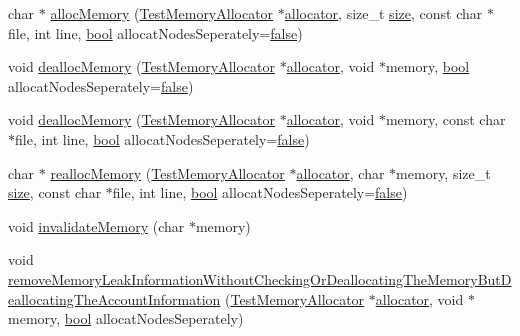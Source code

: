 \begin{DoxyCompactItemize}
\item 
char $\ast$ \hyperlink{class_memory_leak_detector_ace7838f234f5dea076a6ab2528a66164}{alloc\+Memory} (\hyperlink{class_test_memory_allocator}{Test\+Memory\+Allocator} $\ast$\hyperlink{_memory_leak_warning_test_8cpp_a83fc2e9b9142613f7df2bcc3ff8292bc}{allocator}, size\+\_\+t \hyperlink{gst__avb__playbin_8c_a439227feff9d7f55384e8780cfc2eb82}{size}, const char $\ast$file, int line, \hyperlink{avb__gptp_8h_af6a258d8f3ee5206d682d799316314b1}{bool} allocat\+Nodes\+Seperately=\hyperlink{avb__gptp_8h_af6a258d8f3ee5206d682d799316314b1ae9de385ef6fe9bf3360d1038396b884c}{false})
\item 
void \hyperlink{class_memory_leak_detector_a1526d6f241a7f41eaeae20fd2c712873}{dealloc\+Memory} (\hyperlink{class_test_memory_allocator}{Test\+Memory\+Allocator} $\ast$\hyperlink{_memory_leak_warning_test_8cpp_a83fc2e9b9142613f7df2bcc3ff8292bc}{allocator}, void $\ast$memory, \hyperlink{avb__gptp_8h_af6a258d8f3ee5206d682d799316314b1}{bool} allocat\+Nodes\+Seperately=\hyperlink{avb__gptp_8h_af6a258d8f3ee5206d682d799316314b1ae9de385ef6fe9bf3360d1038396b884c}{false})
\item 
void \hyperlink{class_memory_leak_detector_a235bec7842c694f869f6edbf131a6c55}{dealloc\+Memory} (\hyperlink{class_test_memory_allocator}{Test\+Memory\+Allocator} $\ast$\hyperlink{_memory_leak_warning_test_8cpp_a83fc2e9b9142613f7df2bcc3ff8292bc}{allocator}, void $\ast$memory, const char $\ast$file, int line, \hyperlink{avb__gptp_8h_af6a258d8f3ee5206d682d799316314b1}{bool} allocat\+Nodes\+Seperately=\hyperlink{avb__gptp_8h_af6a258d8f3ee5206d682d799316314b1ae9de385ef6fe9bf3360d1038396b884c}{false})
\item 
char $\ast$ \hyperlink{class_memory_leak_detector_a6aded764a2297f52a104b75eae2d4b5c}{realloc\+Memory} (\hyperlink{class_test_memory_allocator}{Test\+Memory\+Allocator} $\ast$\hyperlink{_memory_leak_warning_test_8cpp_a83fc2e9b9142613f7df2bcc3ff8292bc}{allocator}, char $\ast$memory, size\+\_\+t \hyperlink{gst__avb__playbin_8c_a439227feff9d7f55384e8780cfc2eb82}{size}, const char $\ast$file, int line, \hyperlink{avb__gptp_8h_af6a258d8f3ee5206d682d799316314b1}{bool} allocat\+Nodes\+Seperately=\hyperlink{avb__gptp_8h_af6a258d8f3ee5206d682d799316314b1ae9de385ef6fe9bf3360d1038396b884c}{false})
\item 
void \hyperlink{class_memory_leak_detector_a1b924f98e6bf1203714985e0b0c3de5d}{invalidate\+Memory} (char $\ast$memory)
\item 
void \hyperlink{class_memory_leak_detector_ac17764ba8c2ced15cbbbca1731f6b21e}{remove\+Memory\+Leak\+Information\+Without\+Checking\+Or\+Deallocating\+The\+Memory\+But\+Deallocating\+The\+Account\+Information} (\hyperlink{class_test_memory_allocator}{Test\+Memory\+Allocator} $\ast$\hyperlink{_memory_leak_warning_test_8cpp_a83fc2e9b9142613f7df2bcc3ff8292bc}{allocator}, void $\ast$memory, \hyperlink{avb__gptp_8h_af6a258d8f3ee5206d682d799316314b1}{bool} allocat\+Nodes\+Seperately)

\end{DoxyCompactItemize}
